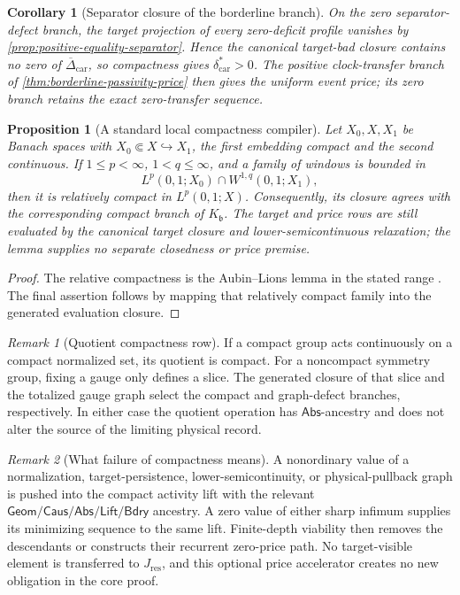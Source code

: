 \documentclass[11pt]{article}
\numberwithin{section}{part}
\theoremstyle{plain}
\newtheorem{proposition}[proposition]{Proposition}
\newtheorem{corollary}[corollary]{Corollary}
\theoremstyle{definition}
\theoremstyle{remark}
\newtheorem{remark}[remark]{Remark}
\newcommand{\Geom}{\mathsf{Geom}}
\newcommand{\Caus}{\mathsf{Caus}}
\newcommand{\Abs}{\mathsf{Abs}}
\newcommand{\Lift}{\mathsf{Lift}}
\newcommand{\Bdry}{\mathsf{Bdry}}
\newcommand{\Res}{J_{\mathrm{res}}}
\begin{document}
\begin{corollary}[Separator closure of the borderline branch]
\label{cor:separator-borderline-passivity}
On the zero separator-defect branch, the target projection of every
zero-deficit profile vanishes by
\cref{prop:positive-equality-separator}.  Hence the canonical target-bad
closure contains no zero of \(\overline\Delta_{\mathrm{car}}\), so compactness
gives \(\delta_{\mathrm{car}}^*>0\).  The positive clock-transfer branch of
\cref{thm:borderline-passivity-price} then gives the uniform event price; its
zero branch retains the exact zero-transfer sequence.
\end{corollary}

\begin{proposition}[A standard local compactness compiler]
\label{prop:aubin-lions-compiler}
Let \(X_0,X,X_1\) be Banach spaces with
\(X_0\Subset X\hookrightarrow X_1\), the first embedding compact and the
second continuous.  If \(1\le p<\infty\), \(1<q\le\infty\), and a family
of windows is bounded in
\[
 L^p(0,1;X_0)\cap W^{1,q}(0,1;X_1),
\]
then it is relatively compact in \(L^p(0,1;X)\).  Consequently, its closure
agrees with the corresponding compact branch of \(K_{\mathfrak b}\).  The target
and price rows are still evaluated by the canonical target closure and
lower-semicontinuous relaxation; the lemma supplies no separate closedness or
price premise.
\end{proposition}

\begin{proof}
The relative compactness is the Aubin--Lions lemma in the stated range
\citep{Aubin1963,Lions1969,Simon1986}.  The final assertion follows by mapping
that relatively compact family into the generated evaluation closure.
\end{proof}

\begin{remark}[Quotient compactness row]
If a compact group acts continuously on a compact normalized set, its
quotient is compact.  For a noncompact symmetry group, fixing a gauge only
defines a slice.  The generated closure of that slice and the totalized gauge
graph select the compact and graph-defect branches, respectively.  In either
case the quotient operation has \(\Abs\)-ancestry and does not alter the
source of the limiting physical record.
\end{remark}

\begin{remark}[What failure of compactness means]
\label{rem:compactness-invariant}
A nonordinary value of a normalization, target-persistence,
lower-semicontinuity, or physical-pullback graph is pushed into the compact
activity lift with the relevant
\(\Geom/\Caus/\Abs/\Lift/\Bdry\) ancestry.  A zero value of either sharp
infimum supplies its minimizing sequence to the same lift.  Finite-depth
viability then removes the descendants or constructs their recurrent
zero-price path.  No target-visible element is transferred to \(\Res\), and
this optional price accelerator creates no new obligation in the core proof.
\end{remark}
\end{document}
